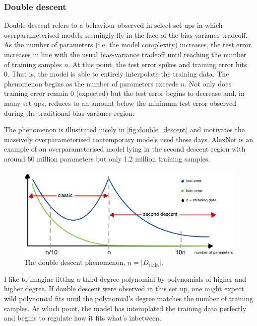 \documentclass[11pt]{article}
\begin{document}
\subsubsection{Double descent}
Double descent refers to a behaviour observed in select set ups in which overparameterised models seemingly fly in the face of the bias-variance tradeoff. As the number of parameters (i.e. the model complexity) increases, the test error increases in line with the usual bias-variance tradeoff until reaching the number of training samples $n$. At this point, the test error spikes and training error hits 0. That is, the model is able to entirely interpolate the training data. The phenomenon begins as the number of parameters exceeds $n$. Not only does training error remain 0 (expected) but the test error begins to decrease and, in many set ups, reduces to an amount below the minimum test error observed during the traditional bias-variance region.

The phenomenon is illustrated nicely in \autoref{fig:double_descent} and motivates the massively overparameterised contemporary models used these days. AlexNet is an example of an overparameterised model lying in the second descent region with around 60 million parameters but only 1.2 million training samples.

\begin{figure}[t]
    \centering
    \includegraphics[width=1\columnwidth]{./figures/supervised_learning/double_descent.pdf}
    \caption{The double descent phenomenon, $n=|D_{\text{train}}|$.}
    \label{fig:double_descent}
\end{figure}

I like to imagine fitting a third degree polynomial by polynomials of higher and higher degree. If double descent were observed in this set up, one might expect wild polynomial fits until the polynomial's degree matches the number of training samples. At which point, the model has interoplated the training data perfectly and begins to regulate how it fits what's inbetween.
\end{document}
